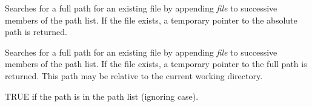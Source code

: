 
Searches for a full path for an existing file by appending {\it file} to
successive members of the path list.  If the file exists, a temporary
pointer to the absolute path is returned.



Searches for a full path for an existing file by appending {\it file} to
successive members of the path list.  If the file exists, a temporary
pointer to the full path is returned. This path may be relative to the current
working directory.



TRUE if the path is in the path list (ignoring case).

